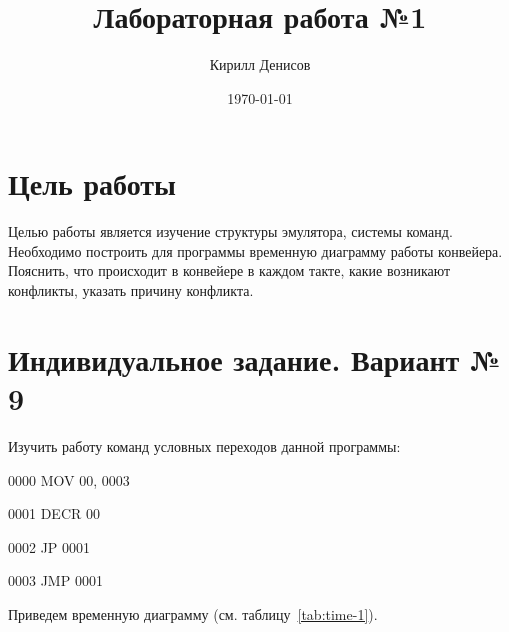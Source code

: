 \documentclass[a4paper,14pt]{extarticle}
\author{Кирилл Денисов}
\title{Лабораторная работа №1}
\date{\today}
\newcommand{\pathToCommonFolder}{/home/denilai/Documents/repos/latex/Common}
\begin{document}
	\thispagestyle{empty}
	
	\newpage
	

	
\section*{Цель работы}
Целью работы является изучение структуры эмулятора, системы команд. Необходимо
построить для программы  временную диаграмму работы
конвейера. Пояснить, что происходит в конвейере в каждом
такте, какие возникают конфликты, указать причину конфликта.
\section*{Индивидуальное задание. Вариант № 9}

\begin{problem*}
	Изучить работу команд условных переходов данной программы:
	
	0000 MOV 00, 0003
	
	0001 DECR 00
	
	0002 JP 0001
	
	0003 JMP 0001
	
	\nonum{} Приведем временную диаграмму (см. таблицу~\ref{tab:time-1}).
\end{problem*}
\end{document}
